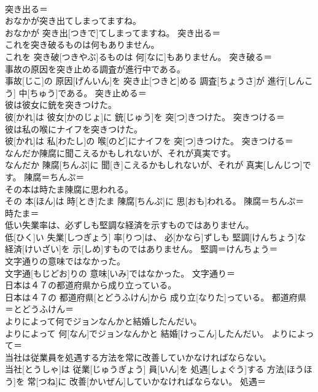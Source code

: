 \documentclass[8pt]{extreport}
\begin{document}
\begin{CJK}{UTF8}{min}
\\	突き出る＝ 
\\	おなかが突き出てしまってますね。	
\\	おなかが 突き出[つきで]てしまってますね。	突き出る＝ 
\\	これを突き破るものは何もありません。	
\\	これを 突き破[つきやぶ]るものは 何[なに]もありません。	突き破る＝ 
\\	事故の原因を突き止める調査が進行中である。	
\\	事故[じこ]の 原因[げんいん]を 突き止[つきと]める 調査[ちょうさ]が 進行[しんこう] 中[ちゅう]である。	突き止める＝ 
\\	彼は彼女に銃を突きつけた。	
\\	彼[かれ]は 彼女[かのじょ]に 銃[じゅう]を 突[つ]きつけた。	突きつける＝ 
\\	彼は私の喉にナイフを突きつけた。	
\\	彼[かれ]は 私[わたし]の 喉[のど]にナイフを 突[つ]きつけた。	突きつける＝ 
\\	なんだか陳腐に聞こえるかもしれないが、それが真実です。	
\\	なんだか 陳腐[ちんぷ]に 聞[き]こえるかもしれないが、それが 真実[しんじつ]です。	陳腐＝ちんぷ＝ 
\\	その本は時たま陳腐に思われる。	
\\	その 本[ほん]は 時[とき]たま 陳腐[ちんぷ]に 思[おも]われる。	陳腐＝ちんぷ＝ 
\\	時たま＝ 
\\	低い失業率は、必ずしも堅調な経済を示すものではありません。	
\\	低[ひく]い 失業[しつぎょう] 率[りつ]は、 必[かなら]ずしも 堅調[けんちょう]な 経済[けいざい]を 示[しめ]すものではありません。	堅調＝けんちょう＝ 
\\	文字通りの意味ではなかった。	
\\	文字通[もじどお]りの 意味[いみ]ではなかった。	文字通り＝ 
\\	日本は４７の都道府県から成り立っている。	
\\	日本は４７の 都道府県[とどうふけん]から 成り立[なりた]っている。	都道府県＝とどうふけん＝ 
\\	よりによって何でジョンなんかと結婚したんだい。	
\\	よりによって 何[なん]でジョンなんかと 結婚[けっこん]したんだい。	よりによって＝ 
\\	当社は従業員を処遇する方法を常に改善していかなければならない。	
\\	当社[とうしゃ]は 従業[じゅうぎょう] 員[いん]を 処遇[しょぐう]する 方法[ほうほう]を 常[つね]に 改善[かいぜん]していかなければならない。	処遇＝ 

\end{CJK}
\end{document}
